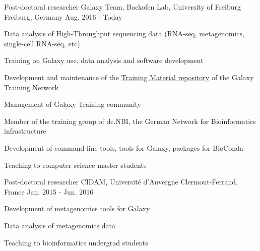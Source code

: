 

\begin{cventries}

  \cventry
    {Post-doctoral researcher} %
    {Galaxy Team, Backofen Lab, University of Freiburg} %
    {Freiburg, Germany} %
    {Aug. 2016 - Today} %
    {
      \begin{cvitems} %
        \item {Data analysis of High-Throughput sequencing data (RNA-seq, metagenomics, single-cell RNA-seq, etc)}
        \item {Training on Galaxy use, data analysis and software development}
        \item {Development and maintenance of the \href{https://galaxyproject.github.io/training-material/}{Training Material repository} of the Galaxy Training Network}
        \item {Management of Galaxy Training community}
        \item {Member of the training group of de.NBI, the German Network for Bioinformatics infrastructure}
        \item {Development of command-line tools, tools for Galaxy, packages for BioConda}
        \item {Teaching to computer science master students}
      \end{cvitems}
    }

  \cventry
    {Post-doctoral researcher} %
    {CIDAM, Université d'Auvergne} %
    {Clermont-Ferrand, France} %
    {Jan. 2015 - Jun. 2016} %
    {
      \begin{cvitems} %
        \item {Development of metagenomics tools for Galaxy}
        \item {Data analysis of metagenomics data}
        \item {Teaching to bioinformatics undergrad students}
      \end{cvitems}
    }


\end{cventries}
